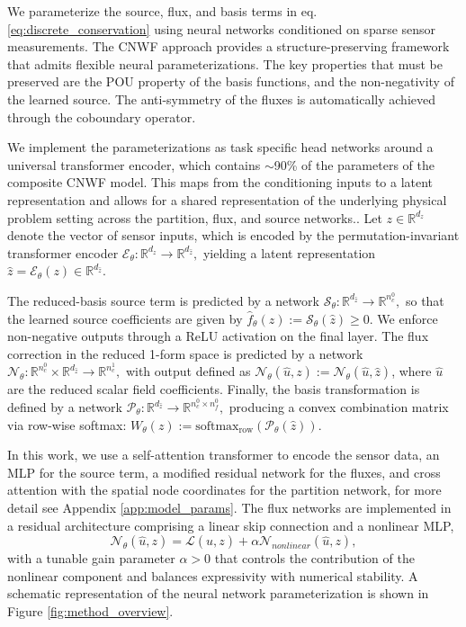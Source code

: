 \documentclass[onefignum,onetabnum]{siamart171218} %
\begin{document}
We parameterize the source, flux, and basis terms in eq. \ref{eq:discrete_conservation} using neural networks conditioned on sparse sensor measurements.
The CNWF approach provides a structure-preserving framework that admits flexible neural parameterizations. The key properties that must be preserved are the POU property of the basis functions, and the non-negativity of the learned source. The anti-symmetry of the fluxes is automatically achieved through the coboundary operator.

We implement the parameterizations as task specific head networks around a universal transformer encoder, which contains $\sim$90\% of the parameters of the composite CNWF model. This maps from the conditioning inputs to a latent representation and allows for a shared representation of the underlying physical problem setting across the partition, flux, and source networks.. Let \( z \in \mathbb{R}^{d_z} \) denote the vector of sensor inputs, which is encoded by the permutation-invariant transformer encoder
\(
    \mathcal{E}_\theta : \mathbb{R}^{d_z} \to \mathbb{R}^{d_{\hat{z}}},
\)
yielding a latent representation \( \hat{z} = \mathcal{E}_\theta(z) \in \mathbb{R}^{d_{\hat{z}}} \).

The reduced-basis source term is predicted by a network
\(
    \mathcal{S}_\theta : \mathbb{R}^{d_{\hat{z}}} \to \mathbb{R}^{n_c^0},
\)
so that the learned source coefficients are given by \( \hat{f}_\theta(z) := \mathcal{S}_\theta(\hat{z}) \geq 0\). We enforce non-negative outputs through a ReLU activation on the final layer.
The flux correction in the reduced 1-form space is predicted by a network
\(
    \mathcal{N}_\theta : \mathbb{R}^{n_c^0} \times \mathbb{R}^{d_{\hat{z}}} \to \mathbb{R}^{n_c^1},
\)
with output defined as \( \mathcal{N}_\theta(\hat{u}, z) := \mathcal{N}_\theta(\hat{u}, \hat{z}) \), where \( \hat{u} \) are the reduced scalar field coefficients.
Finally, the basis transformation is defined by a network
\(
    \mathcal{P}_\theta : \mathbb{R}^{d_{\hat{z}}} \to \mathbb{R}^{n_c^0 \times n_f^0},
\)
producing a convex combination matrix via row-wise softmax:
\(
    W_\theta(z) := \text{softmax}_{\text{row}} \left( \mathcal{P}_\theta(\hat{z}) \right).
\)

In this work, we use a self-attention transformer to encode the sensor data, an MLP for the source term, a modified residual network for the fluxes, and cross attention with the spatial node coordinates for the partition network, for more detail see Appendix \ref{app:model_params}. The flux networks are implemented in a residual architecture comprising a linear skip connection and a nonlinear MLP,
\[
    \mathcal{N}_\theta(\hat{u}, z) = \mathcal{L}(\hat{u}, z) + \alpha\mathcal{N}_{nonlinear}(\hat{u}, z),
\]
with a tunable gain parameter \( \alpha > 0\) that controls the contribution of the nonlinear component and balances expressivity with numerical stability. A schematic representation of the neural network parameterization is shown in Figure \ref{fig:method_overview}.
\end{document}
